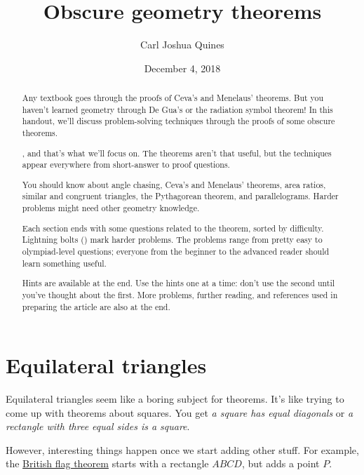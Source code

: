 \documentclass[11pt,paper=letter]{scrartcl}
\newcommand{\faBolt}{\emoji{high-voltage}}
\begin{document}
\title{Obscure geometry theorems}
\author{Carl Joshua Quines}
\date{December 4, 2018}

\maketitle

\begin{abstract}

Any textbook goes through the proofs of Ceva's and Menelaus' theorems. But you haven't learned geometry through De Gua's or the radiation symbol theorem! In this handout, we'll discuss problem-solving techniques through the proofs of some obscure theorems.

, and that's what we'll focus on. The theorems aren't that useful, but the techniques appear everywhere from short-answer to proof questions.

You should know about angle chasing, Ceva's and Menelaus' theorems, area ratios, similar and congruent triangles, the Pythagorean theorem, and parallelograms. Harder problems might need other geometry knowledge.

Each section ends with some questions related to the theorem, sorted by difficulty. Lightning bolts (\faBolt) mark harder problems. The problems range from pretty easy to olympiad-level questions; everyone from the beginner to the advanced reader should learn something useful.

Hints are available at the end. Use the hints one at a time: don't use the second until you've thought about the first. More problems, further reading, and references used in preparing the article are also at the end.

\end{abstract}

\section{Equilateral triangles}

Equilateral triangles seem like a boring subject for theorems. It's like trying to come up with theorems about squares. You get \emph{a square has equal diagonals} or \emph{a rectangle with three equal sides is a square}.

However, interesting things happen once we start adding other stuff. For example, the \href{https://en.wikipedia.org/wiki/British_flag_theorem}{British flag theorem} starts with a rectangle $ABCD$, but adds a point $P$.
\end{document}

